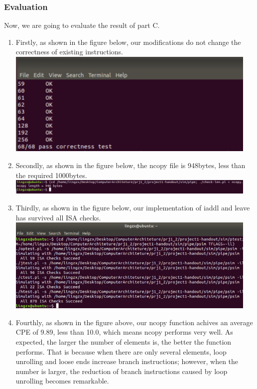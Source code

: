 \documentclass{article}
\begin{document}
\subsubsection{Evaluation}
    Now, we are going to evaluate the result of part C.\\
\begin{enumerate}

  \item Firstly, as shown in the figure below, our modifications do not change the correctness of existing instructions.\\
  \includegraphics[width=0.95\textwidth]{pipe_correctness.png}
  \item Secondly, as shown in the figure below, the ncopy file is 948bytes, less than the required 1000bytes. \\
  \includegraphics[width=0.95\textwidth]{pipe_checklen.png}
  \item Thirdly, as shown in the figure below, our implementation of iaddl and leave has survived all ISA checks.\\
  \includegraphics[width=0.95\textwidth]{pipe_ISACheck.png}
  \item Fourthly, as shown in the figure above, our ncopy function achives an average CPE of 9.89, less than 10.0, which means ncopy performs very well. As expected, the larger the number of elements is, the better the function performs. That is because when there are only several elements, loop unrolling and loose ends increase branch instructions; however, when the number is larger, the reduction of branch instructions caused by loop unrolling becomes remarkable.\\

\end{enumerate}
\end{document}

